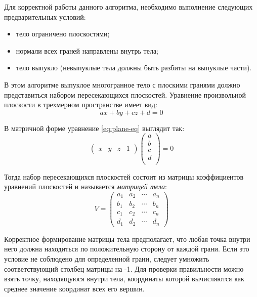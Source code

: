 Для корректной работы данного алгоритма, необходимо выполнение следующих предварительных условий:
\begin{itemize}[label=--]
	\item тело ограничено плоскостями;
	\item нормали всех граней направлены внутрь тела;
	\item тело выпукло (невыпуклые тела должны быть разбиты на выпуклые части).
\end{itemize}

В этом алгоритме выпуклое многогранное тело с плоскими гранями должно представиться набором пересекающихся плоскостей. Уравнение произвольной плоскости в трехмерном пространстве имеет вид:
\begin{equation}
	ax + by + cz + d = 0
	\label{eq:plane-eq}
\end{equation}

В матричной форме уравнение \ref{eq:plane-eq} выглядит так:
\begin{equation}
	\begin{pmatrix}
		x & y & z & 1
	\end{pmatrix}
	\begin{pmatrix}
		a \\
		b \\
		c \\
		d \\
	\end{pmatrix}
	= 0
	\label{eq:matrix-plane-eq1}
\end{equation}

Тогда набор пересекающихся плоскостей состоит из матрицы коэффициентов уравнений плоскостей и называется \textit{матрицей тела}:
\begin{equation}
	V = 
	\begin{pmatrix}
		a_1 & a_2 & \cdots & a_n \\
		b_1 & b_2 & \cdots & b_n \\
		c_1 & c_2 & \cdots & c_n \\
		d_1 & d_2 & \cdots & d_n
	\end{pmatrix}
	\label{eq:model-matrix}
\end{equation}

Корректное формирование матрицы тела предполагает, что любая точка внутри него должна находиться по положительную сторону от каждой грани. Если это условие не соблюдено для определенной грани, следует умножить соответствующий столбец матрицы на -1. Для проверки правильности можно взять точку, находящуюся внутри тела, координаты которой вычисляются как среднее значение координат всех его вершин.

